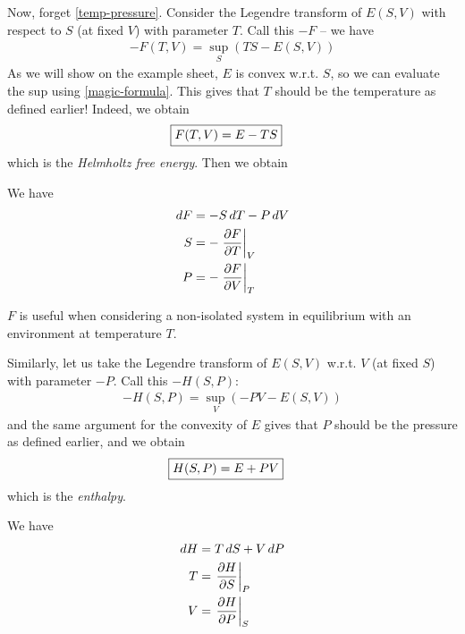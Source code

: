 \documentclass{../template/note}
\begin{document}
    Now, forget \cref{temp-pressure}. Consider the Legendre transform of $E(S, V)$ with respect to $S$ (at fixed $V$) with parameter $T$. Call this $-F$ -- we have
    \begin{align*}
        -F(T, V) = \sup_S \left(TS - E(S, V)\right)
    \end{align*}
    As we will show on the example sheet, $E$ is convex w.r.t. $S$, so we can evaluate the sup using \cref{magic-formula}. This gives that $T$ should be the temperature as defined earlier! Indeed, we obtain
    \begin{align*}
        \Aboxed{F(T, V) = E - TS}
    \end{align*}
    which is the \emph{Helmholtz free energy}. Then we obtain
    \begin{proposition}
        We have
        \begin{align*}
            dF &= -S \D T - P \D V \\
            S &= -\pd[V]{F}{T} \\
            P &= -\pd[T]{F}{V}
        \end{align*}
    \end{proposition}
    
    \begin{remark*}
        $F$ is useful when considering a non-isolated system in equilibrium with an environment at temperature $T$.
    \end{remark*}
    
    Similarly, let us take the Legendre transform of $E(S, V)$ w.r.t. $V$ (at fixed $S$) with parameter $-P$. Call this $-H(S, P)$:
    \begin{align*}
        -H(S, P) = \sup_V \left(-PV - E(S, V)\right)
    \end{align*}
    and the same argument for the convexity of $E$ gives that $P$ should be the pressure as defined earlier, and we obtain
    \begin{align*}
        \Aboxed{H(S, P) = E + PV}
    \end{align*}
    which is the \emph{enthalpy}.
    
    \begin{proposition}
        We have
        \begin{align*}
            dH &= T \D S + V \D P \\
            T &= \pd[P]{H}{S} \\
            V &= \pd[S]{H}{P}
        \end{align*}
    \end{proposition}
    
\end{document}
